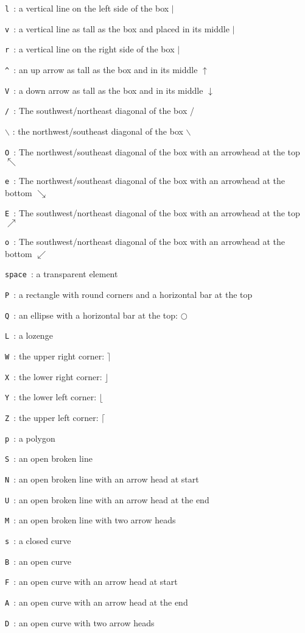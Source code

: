 \begin{description}
\item{ {\tt l }}: a vertical line on the left side of the box $\mid$
\item{ {\tt v }}: a vertical line as tall as the box and placed in its
middle $\mid$
\item{ {\tt r }}: a vertical line on the right side of the box $\mid$
\item{ {\tt \^{ } }}: an up arrow as tall as the box and in its middle
$\uparrow$
\item{ {\tt V }}: a down arrow as tall as the box and in its middle
$\downarrow$
\item{ {\tt / }}: The southwest/northeast diagonal of the box /
\item{ $\backslash$ }: the northwest/southeast diagonal of the box $\backslash$
\item{ {\tt O }}: The northwest/southeast diagonal of the box with an
arrowhead at the top $\nwarrow$
\item{ {\tt e }}: The northwest/southeast diagonal of the box with an
arrowhead at the bottom $\searrow$
\item{ {\tt E }}: The southwest/northeast diagonal of the box with an
arrowhead at the top $\nearrow$
\item{ {\tt o }}: The southwest/northeast diagonal of the box with an
arrowhead at the bottom $\swarrow$
\item{ {\tt space }}: a transparent element
\item{ {\tt P }}: a rectangle with round corners and a horizontal bar
at the top
\item{ {\tt Q }}: an ellipse with a horizontal bar at the top: $\bigcirc$
\item{ {\tt L }}: a lozenge
\item{ {\tt W }}: the upper right corner: $\rceil$
\item{ {\tt X }}: the lower right corner: $\rfloor$
\item{ {\tt Y }}: the lower left corner: $\lfloor$
\item{ {\tt Z }}: the upper left corner: $\lceil$
\item{ {\tt p }}: a polygon
\item{ {\tt S }}: an open broken line
\item{ {\tt N }}: an open broken line with an arrow head at start
\item{ {\tt U }}: an open broken line with an arrow head at the end
\item{ {\tt M }}: an open broken line with two arrow heads
\item{ {\tt s }}: a closed curve
\item{ {\tt B }}: an open curve
\item{ {\tt F }}: an open curve with an arrow head at start
\item{ {\tt A }}: an open curve with an arrow head at the end
\item{ {\tt D }}: an open curve with two arrow heads
\end{description}


